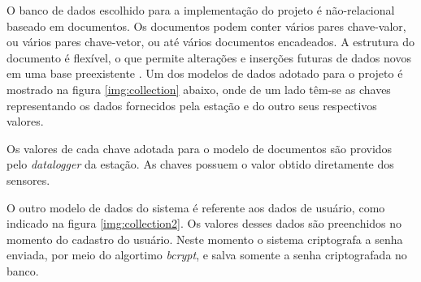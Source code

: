 O banco de dados escolhido para a implementação do projeto é não-relacional baseado em documentos. Os documentos podem conter vários pares chave-valor, ou vários pares chave-vetor, ou até vários documentos encadeados. A estrutura do documento é flexível, o que permite alterações e inserções futuras de dados novos em uma base preexistente \cite{SITEMONGODB}. Um dos modelos de dados adotado para o projeto é mostrado na figura \ref{img:collection} abaixo, onde de um lado têm-se as chaves representando os dados fornecidos pela estação e do outro seus respectivos valores.

Os valores de cada chave adotada para o modelo de documentos são providos pelo \textit{datalogger} da estação. As chaves possuem o valor obtido diretamente dos sensores.


\newpage
{}


O outro modelo de dados do sistema é referente aos dados de usuário, como indicado na figura \ref{img:collection2}. Os valores desses dados são preenchidos no momento do cadastro do usuário. Neste momento o sistema criptografa a senha enviada, por meio do algortimo \textit{bcrypt}, e salva somente a senha criptografada no banco. 

